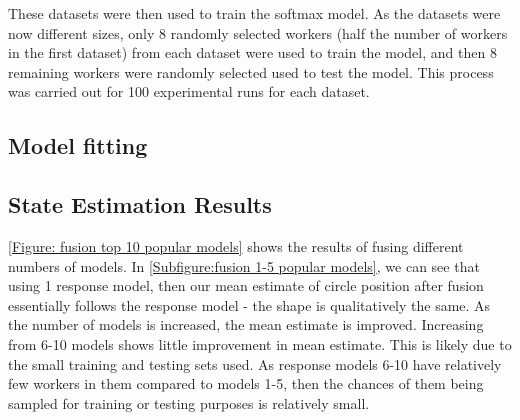These datasets were then used to train the softmax model. As the datasets were now different sizes, only 8 randomly selected workers (half the number of workers in the first dataset) from each dataset were used to train the model, and then 8 remaining workers were randomly selected used to test the model. This process was carried out for 100 experimental runs for each dataset. 

\subsection{Model fitting}










\subsection{State Estimation Results}

\ref{Figure: fusion top 10 popular models} shows the results of fusing different numbers of models. In \ref{Subfigure:fusion 1-5 popular models}, we can see that using 1 response model, then our mean estimate of circle position after fusion essentially follows the response model - the shape is qualitatively the same.  As the number of models is increased, the mean estimate is improved. Increasing from 6-10 models shows little improvement in mean estimate. This is likely due to the small training and testing sets used. As response models 6-10 have relatively few workers in them compared to models 1-5, then the chances of them being sampled for training or testing purposes is relatively small.


